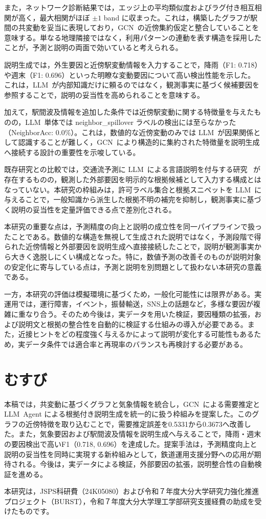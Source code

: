 \documentclass[technicalreport]{ieicej}
\newcommand{\LLM}{LLM}
\newcommand{\GCN}{GCN}
\begin{document}
また，ネットワーク診断結果では，エッジ上の平均類似度およびラグ付き相互相関が高く，最大相関がほぼ $\pm1$ band に収まった。これは，構築したグラフが駅間の共変動を妥当に表現しており，\GCN\ の近傍集約仮定と整合していることを意味する。単なる地理隣接ではなく，利用パターンの連動を表す構造を採用したことが，予測と説明の両面で効いていると考えられる。

説明生成では，外生要因と近傍駅変動情報を入力することで，降雨（F1: 0.718）や週末（F1: 0.696）といった明瞭な変動要因について高い検出性能を示した。これは，\LLM\ が内部知識だけに頼るのではなく，観測事実に基づく候補要因を参照することで，説明の妥当性を高められることを意味する。

加えて，駅間波及情報を追加した条件では近傍駅変動に関する特徴量を与えたものの，\LLM\ 単体では neighbor\_spillover ラベルの検出には至らなかった（NeighborAcc: 0.0\%）。これは，数値的な近傍変動のみでは \LLM\ が因果関係として認識することが難しく，\GCN\ により構造的に集約された特徴量を説明生成へ接続する設計の重要性を示唆している。

既存研究との比較では，交通流予測に \LLM\ による言語説明を付与する研究~\cite{guo2024towards} が存在するものの，観測した外部要因を明示的な根拠候補として入力する構成とはなっていない。本研究の枠組みは，許可ラベル集合と根拠スニペットを \LLM\ に与えることで，一般知識から派生した根拠不明の補完を抑制し，観測事実に基づく説明の妥当性を定量評価できる点で差別化される。

本研究の重要な点は，予測精度の向上と説明の成立性を同一パイプラインで扱ったことである。数値的な構造を無視して生成された説明ではなく，予測段階で得られた近傍情報と外部要因を説明生成へ直接接続したことで，説明が観測事実から大きく逸脱しにくい構成となった。特に，数値予測の改善そのものが説明対象の安定化に寄与している点は，予測と説明を別問題として扱わない本研究の意義である。

一方，本研究の評価は模擬環境に基づくため，一般化可能性には限界がある。実運用では，運行障害，イベント，振替輸送，SNS上の話題など，多様な要因が複雑に重なり合う。そのため今後は，実データを用いた検証，要因種類の拡張，および説明文と根拠の整合性を自動的に検証する仕組みの導入が必要である。また，近接ヒントをどの程度強く与えるかによって説明が変化する可能性もあるため，実データ条件では適合率と再現率のバランスも再検討する必要がある。

\section{むすび}
本稿では，共変動に基づくグラフと気象情報を統合し，\GCN\ による需要推定と \LLM\ Agent による根拠付き説明生成を統一的に扱う枠組みを提案した。このグラフの近傍特徴を取り込むことで，需要推定誤差を0.5331から0.3673へ改善した。また，気象要因および駅間波及情報を説明生成へ与えることで，降雨・週末の要因検出で高いF1（0.718, 0.696）を達成した。提案手法は，予測精度向上と説明の妥当性を同時に実現する新枠組みとして，鉄道運用支援分野への応用が期待される。今後は，実データによる検証，外部要因の拡張，説明整合性の自動検証を進める。

\ack
本研究は，JSPS科研費（24K05080）および令和７年度大分大学研究力強化推進プロジェクト（BURST），令和７年度大分大学理工学部研究支援経費の助成を受けたものです。


\end{document}
